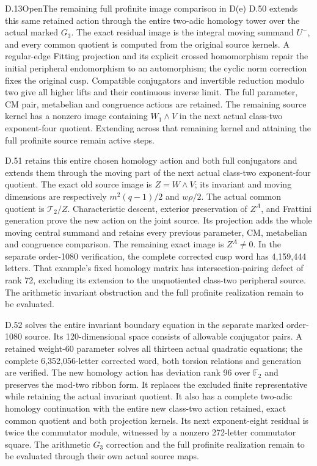 \begin{statement}{D.13}{Open}{The remaining full profinite image comparison in D(e)}
D.50 extends this same retained action through the entire
two-adic homology tower over the actual marked \(G_3\).
The exact residual image is the integral moving summand
\(U^-\), and every common quotient is computed from the
original source kernels. A regular-edge Fitting projection
and its explicit crossed homomorphism repair the initial
peripheral endomorphism to an automorphism; the cyclic
norm correction fixes the original cusp. Compatible
conjugators and invertible reduction modulo two give all
higher lifts and their continuous inverse limit. The
full parameter, CM pair, metabelian and congruence actions
are retained. The remaining source kernel has a nonzero
image containing \(W_1\wedge V\) in the next actual
class-two exponent-four quotient. Extending across that
remaining kernel and attaining the full profinite source
remain active steps.


D.51 retains this entire chosen homology action and both
full conjugators and extends them through the moving
part of the next actual class-two exponent-four quotient.
The exact old source image is \(Z=W\wedge V\); its
invariant and moving dimensions are respectively
\(m^2(q-1)/2\) and \(w\rho/2\). The actual common
quotient is \(\mathcal T_2/Z\). Characteristic descent,
exterior preservation of \(Z^A\), and Frattini generation
prove the new action on the joint source. Its projection
adds the whole moving central summand and retains every
previous parameter, CM, metabelian and congruence comparison.
The remaining exact image is \(Z^A\ne0\). In the separate
order-1080 verification, the complete corrected cusp word
has 4,159,444 letters. That example's fixed homology matrix
has intersection-pairing defect of rank 72, excluding its
extension to the unquotiented class-two peripheral source.
The arithmetic invariant obstruction and the full
profinite realization remain to be evaluated.


D.52 solves the entire invariant boundary equation in the
separate marked order-1080 source. Its 120-dimensional
space consists of allowable conjugator pairs. A retained
weight-60 parameter solves all thirteen actual quadratic
equations; the complete 6,352,056-letter corrected word,
both torsion relations and generation are verified.
The new homology action has deviation rank 96 over
\(\mathbb F_2\) and preserves the mod-two ribbon form.
It replaces the excluded finite representative while
retaining the actual invariant quotient. It also has a
complete two-adic homology continuation with the entire
new class-two action retained, exact common quotient and
both projection kernels. Its next exponent-eight residual
is twice the commutator module, witnessed by a nonzero
272-letter commutator square. The arithmetic \(G_3\)
correction and the full profinite realization remain to
be evaluated through their own actual source maps.



\end{statement}

